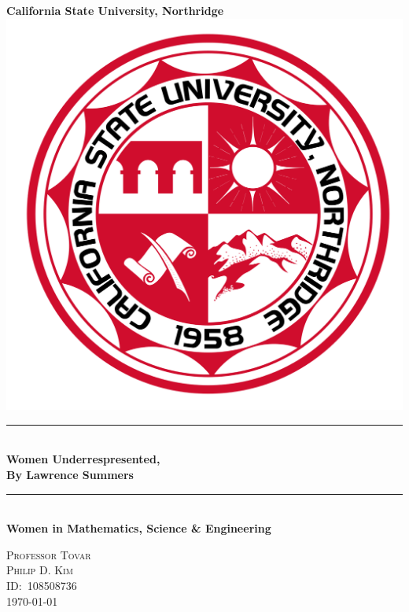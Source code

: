 \begin{titlepage}
  \newcommand{\HRule}{\rule{\linewidth}{0.5mm}}
  \center\Huge\textbf{California State University, Northridge}\\[2cm]
  \includegraphics[scale=0.1]{CSUNS.svg.png}\\[1cm]
  \HRule\  \\[0.4cm]
  {\huge\bfseries Women Underrespresented,\\By Lawrence Summers}\\
  \HRule\  \\[0.4cm]
  \Large\textbf{Women in Mathematics, Science \& Engineering}\\[0.5cm]
  \vfill
  \begin{minipage}{0.4\textwidth}
  \large\centering\textsc{Professor Tovar}\\
  \textsc{Philip D. Kim}\\
  \textsc{ID:\ 108508736}\\
  \textsc{\today}
  \end{minipage}
\end{titlepage}